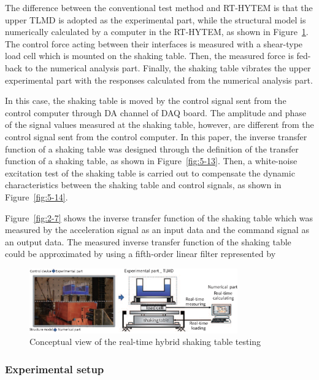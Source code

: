The difference between the conventional test method and RT-HYTEM is that the upper TLMD is adopted as the experimental part, while the structural model is numerically calculated by a computer in the RT-HYTEM, as shown in Figure~\ref{fig:5-12}. The control force acting between their interfaces is measured with a shear-type load cell which is mounted on the shaking table. Then, the measured force is fed-back to the numerical analysis part. Finally, the shaking table vibrates the upper experimental part with the responses calculated from the numerical analysis part.

In this case, the shaking table is moved by the control signal sent from the control computer through DA channel of DAQ board. The amplitude and phase of the signal values measured at the shaking table, however, are different from the control signal sent from the control computer. In this paper, the inverse transfer function of a shaking table was designed through the definition of the transfer function of a shaking table, as shown in Figure~\ref{fig:5-13}. Then, a white-noise excitation test of the shaking table is carried out to compensate the dynamic characteristics between the shaking table and control signals,
as shown in Figure~\ref{fig:5-14}. 

Figure~\ref{fig:2-7} shows the inverse transfer function of the shaking table which was measured by the acceleration signal as an input data and the command signal as an output data. The measured inverse transfer function of the shaking table could be approximated by using a fifth-order linear filter represented by


\begin{figure}[ht]
\centering
\includegraphics[width=0.8\textwidth] {figure/5-12.eps}
\caption{Conceptual view of the real-time hybrid shaking table testing}
\label{fig:5-12}
\end{figure}




\subsubsection{Experimental setup}

